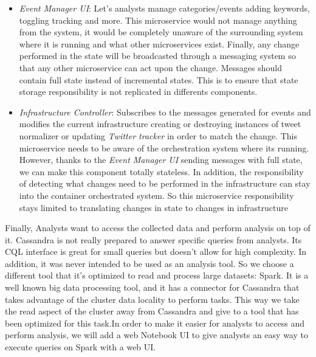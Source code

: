 \begin{itemize}
	\item \textit{Event Manager UI}: Let’s analysts manage categories/events adding keywords, toggling tracking and more. This microservice would not manage anything from the system, it would be completely unaware of the surrounding system where it is running and what other microservices exist. Finally, any change performed in the state will be broadcasted through a messaging system so that any other microservice can act upon the change. Messages should contain full state instead of incremental states. This is to ensure that state storage responsibility is not replicated in differents components. 
	\item \textit{Infrastructure Controller}:  Subscribes to the messages generated for events and modifies the current infrastructure creating or destroying instances of tweet normalizer or updating \textit{Twitter tracker}  in order to match the change. This microservice needs to be aware of the orchestration system where its running. However, thanks to the \textit{Event Manager UI} sending messages with full state, we can make this component totally stateless. In addition, the responsibility of detecting what changes need to be performed in the infrastructure can stay into the container orchestrated system. So this microservice responsibility stays limited to translating changes in state to changes in infrastructure

\end{itemize}



Finally, Analysts want to access the collected data and perform analysis on top of it. Cassandra is not really prepared to answer specific queries from analysts. Its CQL interface is great for small queries but doesn’t allow for high complexity. In addition, it was never intended to be used as an analysis tool. So we choose a different tool that it's optimized to read and process large datasets: Spark. It is a well known big data processing tool, and it has a connector for Cassandra that takes advantage of the cluster data locality to perform tasks. This way we take the read aspect of the cluster away from Cassandra and give to a tool that has been optimized for this task.In order to make it easier for analysts to access and perform analysis, we will add a web Notebook UI to give analysts an easy way to execute queries on Spark with a web UI.
